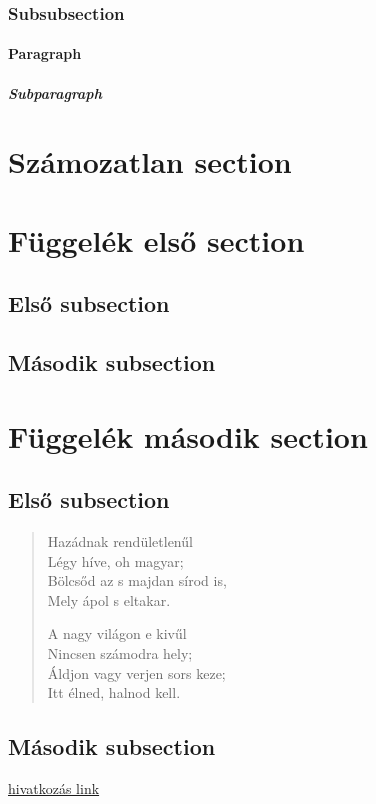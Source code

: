 \documentclass[12pt, twoside]{article}
\begin{document}
\subsubsection{Subsubsection}
\paragraph{Paragraph}
\label{s:masodik}
\subparagraph{Subparagraph}

\section*{Számozatlan section}
\label{s:szamozatlan}
\hulipsum

\appendix
\section{Függelék első section}
\subsection{Első subsection}
\quote{\hulipsum[2]}
\label{s:harmadik}
\subsection{Második subsection}
\quotation{\hulipsum[2]}

\section{Függelék második section}
\subsection{Első subsection}
\begin{verse}
Hazádnak rendületlenűl\\
Légy híve, oh magyar;\\
Bölcsőd az s majdan sírod is,\\
Mely ápol s eltakar.\newline

A nagy világon e kivűl\\
Nincsen számodra hely;\\
Áldjon vagy verjen sors keze;\\
Itt élned, halnod kell.
\end{verse}
\subsection{Második subsection}
\href{https://www.uni-miskolc.hu/~viktoria.vadon/}{hivatkozás link}
\end{document}
